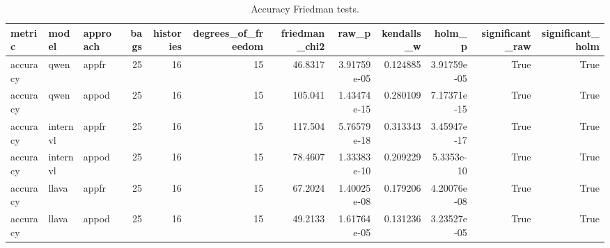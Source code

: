\begin{table}[tbp]
\caption{Accuracy Friedman tests.}
\label{tab:rq3-accuracy-friedman}
\begin{tabular}{lllrrrrrrrrr}
\toprule
metric & model & approach & bags & histories & degrees\_of\_freedom & friedman\_chi2 & raw\_p & kendalls\_w & holm\_p & significant\_raw & significant\_holm \\
\midrule
accuracy & qwen & appfr & 25 & 16 & 15 & 46.8317 & 3.91759e-05 & 0.124885 & 3.91759e-05 & True & True \\
accuracy & qwen & appod & 25 & 16 & 15 & 105.041 & 1.43474e-15 & 0.280109 & 7.17371e-15 & True & True \\
accuracy & internvl & appfr & 25 & 16 & 15 & 117.504 & 5.76579e-18 & 0.313343 & 3.45947e-17 & True & True \\
accuracy & internvl & appod & 25 & 16 & 15 & 78.4607 & 1.33383e-10 & 0.209229 & 5.3353e-10 & True & True \\
accuracy & llava & appfr & 25 & 16 & 15 & 67.2024 & 1.40025e-08 & 0.179206 & 4.20076e-08 & True & True \\
accuracy & llava & appod & 25 & 16 & 15 & 49.2133 & 1.61764e-05 & 0.131236 & 3.23527e-05 & True & True \\
\bottomrule
\end{tabular}
\end{table}
